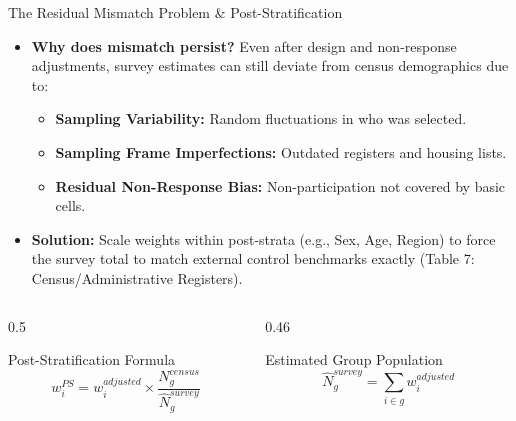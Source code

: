 \documentclass[10pt, aspectratio=169]{beamer}
\begin{document}
\begin{frame}{The Residual Mismatch Problem \& Post-Stratification}
  \begin{itemize}
    \item \textbf{Why does mismatch persist?} Even after design and non-response adjustments, survey estimates can still deviate from census demographics due to:
    \begin{itemize}
      \item \textbf{Sampling Variability:} Random fluctuations in who was selected.
      \item \textbf{Sampling Frame Imperfections:} Outdated registers and housing lists.
      \item \textbf{Residual Non-Response Bias:} Non-participation not covered by basic cells.
    \end{itemize}
    \item \textbf{Solution:} Scale weights within post-strata (e.g., Sex, Age, Region) to force the survey total to match external control benchmarks exactly (Table 7: Census/Administrative Registers).
  \end{itemize}

  \begin{columns}[T]
    \begin{column}{0.5\textwidth}
      \begin{block}{Post-Stratification Formula}
        \begin{equation}
          w_i^{PS} = w_i^{adjusted} \times \frac{N_g^{census}}{\hat{N}_g^{survey}}
        \end{equation}
      \end{block}
    \end{column}
    \begin{column}{0.46\textwidth}
      \begin{block}{Estimated Group Population}
        \begin{equation}
          \hat{N}_g^{survey} = \sum_{i \in g} w_i^{adjusted}
        \end{equation}
      \end{block}
    \end{column}
  \end{columns}
\end{frame}
\end{document}
